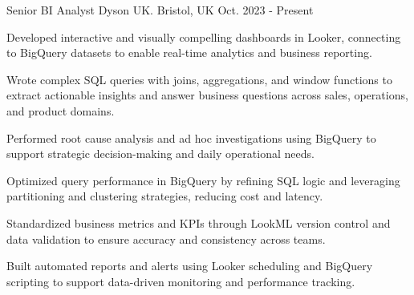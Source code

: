 

\begin{cventries}

  \cventry
    {Senior BI Analyst} %
    {Dyson UK.} %
    {Bristol, UK} %
    {Oct. 2023 - Present} %
    {
      \begin{cvitems} %
        \item {Developed interactive and visually compelling dashboards in Looker, connecting to BigQuery datasets to enable real-time analytics and business reporting.}
        \item {Wrote complex SQL queries with joins, aggregations, and window functions to extract actionable insights and answer business questions across sales, operations, and product domains.}
        \item {Performed root cause analysis and ad hoc investigations using BigQuery to support strategic decision-making and daily operational needs.}
        \item {Optimized query performance in BigQuery by refining SQL logic and leveraging partitioning and clustering strategies, reducing cost and latency.}
        \item {Standardized business metrics and KPIs through LookML version control and data validation to ensure accuracy and consistency across teams.}
        \item {Built automated reports and alerts using Looker scheduling and BigQuery scripting to support data-driven monitoring and performance tracking.}
    \end{cvitems}
    
    }


\end{cventries}

